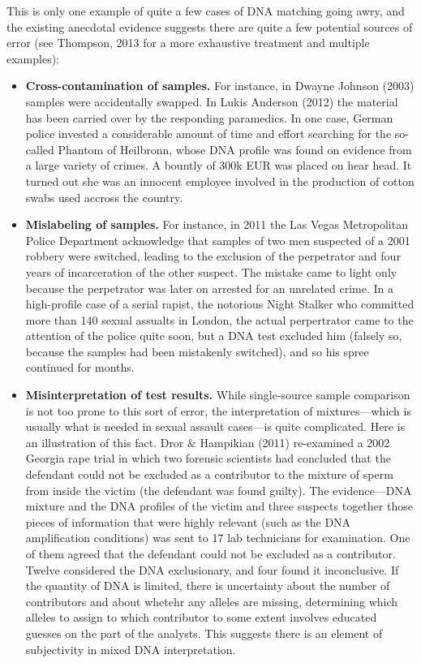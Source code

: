 \documentclass[10pt,dvipsnames,enabledeprecatedfontcommands]{scrartcl}
\begin{document}
This is only one example of quite a few cases of DNA matching going
awry,  and the existing anecdotal
evidence suggests there are quite a few potential sources of error (see
Thompson, 2013 for a more exhaustive treatment and multiple examples):

\begin{itemize}
\item
  \textbf{Cross-contamination of samples.} For instance, in Dwayne
  Johnson (2003) samples were accidentally swapped. In Lukis Anderson
  (2012) the material has been carried over by the responding
  paramedics. In one case, German police invested a considerable amount
  of time and effort searching for the so-called Phantom of Heilbronn,
  whose DNA profile was found on evidence from a large variety of
  crimes. A bountly of 300k EUR was placed on hear head. It turned out
  she was an innocent employee involved in the production of cotton
  swabs used accross the country.
\item
  \textbf{Mislabeling of samples.} For instance, in 2011 the Las Vegas
  Metropolitan Police Department acknowledge that samples of two men
  suspected of a 2001 robbery were switched, leading to the exclusion of
  the perpetrator and four years of incarceration of the other suspect.
  The mistake came to light only because the perpetrator was later on
  arrested for an unrelated crime. In a high-profile case of a serial
  rapist, the notorious Night Stalker who committed more than 140 sexual
  assualts in London, the actual perpertrator came to the attention of
  the police quite soon, but a DNA test excluded him (falsely so,
  because the samples had been mistakenly switched), and so his spree
  continued for months.
\item
  \textbf{Misinterpretation of test results.} While single-source sample
  comparison is not too prone to this sort of error, the interpretation
  of mixtures---which is usually what is needed in sexual assault
  cases---is quite complicated. Here is an illustration of this fact.
  Dror \& Hampikian (2011) re-examined a 2002 Georgia rape trial in
  which two forensic scientists had concluded that the defendant could
  not be excluded as a contributor to the mixture of sperm from inside
  the victim (the defendant was found guilty). The evidence---DNA
  mixture and the DNA profiles of the victim and three suspects together
  those pieces of information that were highly relevant (such as the DNA
  amplification conditions) was sent to 17 lab technicians for
  examination. One of them agreed that the defendant could not be
  excluded as a contributor. Twelve considered the DNA exclusionary, and
  four found it inconclusive. If the quantity of DNA is limited, there
  is uncertainty about the number of contributors and about whetehr any
  alleles are missing, determining which alleles to assign to which
  contributor to some extent involves educated guesses on the part of
  the analysts. This suggests there is an element of subjectivity in
  mixed DNA interpretation.
\end{itemize}
\end{document}
